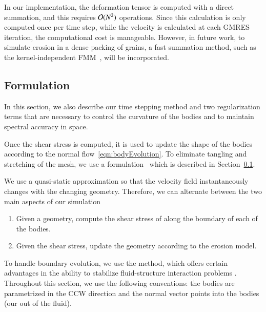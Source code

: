 \documentclass[preprint, 10pt]{elsarticle}
\begin{document}
In our implementation, the deformation tensor is computed with a direct
summation, and this requires ${\mathcal{O}}(N^2)$ operations.  Since this
calculation is only computed once per time step, while the velocity is
calculated at each GMRES iteration, the computational cost is
manageable.  However, in future work, to simulate erosion in a dense
packing of grains, a fast summation method, such as the
kernel-independent FMM~\cite{yin-bir-zor2004}, will be incorporated. 




\subsection{{\thL} Formulation} 
\label{sec:thetaL}

In this section, we also describe our time stepping method and two
regularization terms that are necessary to control the curvature of the
bodies and to maintain spectral accuracy in space.


Once the shear stress is computed, it is used to update the shape of the
bodies according to the normal flow~\eqref{eqn:bodyEvolution}.  To
eliminate tangling and stretching of the mesh, we use a {\thL}
formulation~\cite{hou-low-she1994} which is described in
Section~\ref{sec:thetaL}.




We use a quasi-static approximation so that the velocity field
instantaneously changes with the changing geometry.  Therefore, we can
alternate between the two main aspects of our simulation
\begin{enumerate}
  \item Given a geometry, compute the shear stress of along the boundary
    of each of the bodies.
  \item Given the shear stress, update the geometry according to the
    erosion model.
\end{enumerate}

To handle boundary evolution, we use the {\thL}    method, which offers
certain advantages in the ability to stabilize fluid-structure
interaction problems \cite{hou-low-she1994}. Throughout this section, we
use the following conventions: the bodies are parametrized in the CCW
direction and the normal vector points into the bodies (our out of the
fluid).
\end{document}
